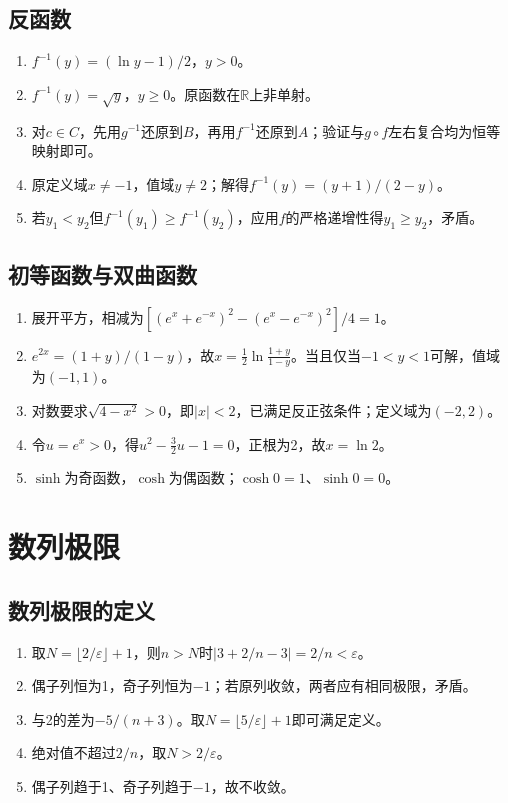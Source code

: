 \documentclass[11pt,a4paper,fontset=fandol]{ctexrep}
\begin{document}
\subsection{反函数}
\begin{enumerate}
\item $f^{-1}(y)=(\ln y-1)/2$，$y>0$。
\item $f^{-1}(y)=\sqrt y$，$y\ge0$。原函数在$\mathbb R$上非单射。
\item 对$c\in C$，先用$g^{-1}$还原到$B$，再用$f^{-1}$还原到$A$；验证与$g\circ f$左右复合均为恒等映射即可。
\item 原定义域$x\ne-1$，值域$y\ne2$；解得$f^{-1}(y)=(y+1)/(2-y)$。
\item 若$y_1<y_2$但$f^{-1}(y_1)\ge f^{-1}(y_2)$，应用$f$的严格递增性得$y_1\ge y_2$，矛盾。
\end{enumerate}
\subsection{初等函数与双曲函数}
\begin{enumerate}
\item 展开平方，相减为$[(e^x+e^{-x})^2-(e^x-e^{-x})^2]/4=1$。
\item $e^{2x}=(1+y)/(1-y)$，故$x=\frac12\ln\frac{1+y}{1-y}$。当且仅当$-1<y<1$可解，值域为$(-1,1)$。
\item 对数要求$\sqrt{4-x^2}>0$，即$|x|<2$，已满足反正弦条件；定义域为$(-2,2)$。
\item 令$u=e^x>0$，得$u^2-\frac32u-1=0$，正根为2，故$x=\ln2$。
\item $\sinh$为奇函数，$\cosh$为偶函数；$\cosh0=1$、$\sinh0=0$。
\end{enumerate}
\section{数列极限}
\subsection{数列极限的定义}
\begin{enumerate}
\item 取$N=\lfloor2/\varepsilon\rfloor+1$，则$n>N$时$|3+2/n-3|=2/n<\varepsilon$。
\item 偶子列恒为1，奇子列恒为$-1$；若原列收敛，两者应有相同极限，矛盾。
\item 与2的差为$-5/(n+3)$。取$N=\lfloor5/\varepsilon\rfloor+1$即可满足定义。
\item 绝对值不超过$2/n$，取$N>2/\varepsilon$。
\item 偶子列趋于1、奇子列趋于$-1$，故不收敛。
\end{enumerate}
\end{document}
